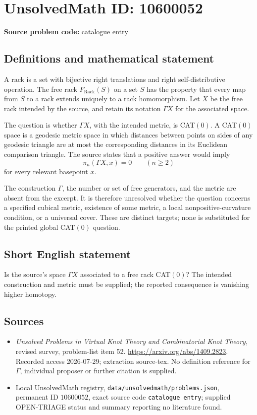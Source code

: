 \documentclass[11pt]{article}
\begin{document}
\section*{UnsolvedMath ID: 10600052}
\textbf{Source problem code:} catalogue entry
\subsection{Definitions and mathematical statement}
A rack is a set with bijective right translations and right self-distributive operation. The free rack \(F_{\mathrm{Rack}}(S)\) on a set \(S\) has the property that every map from \(S\) to a rack extends uniquely to a rack homomorphism. Let \(X\) be the free rack intended by the source, and retain its notation \(\Gamma X\) for the associated space.

The question is whether \(\Gamma X\), with the intended metric, is CAT\((0)\). A CAT\((0)\) space is a geodesic metric space in which distances between points on sides of any geodesic triangle are at most the corresponding distances in its Euclidean comparison triangle. The source states that a positive answer would imply
\[
 \pi_n(\Gamma X,x)=0\qquad(n\geq2)
\]
for every relevant basepoint \(x\).

The construction \(\Gamma\), the number or set of free generators, and the metric are absent from the excerpt. It is therefore unresolved whether the question concerns a specified cubical metric, existence of some metric, a local nonpositive-curvature condition, or a universal cover. These are distinct targets; none is substituted for the printed global CAT\((0)\) question.
\subsection{Short English statement}
Is the source's space \(\Gamma X\) associated to a free rack CAT\((0)\)? The intended construction and metric must be supplied; the reported consequence is vanishing higher homotopy.
\subsection{Sources}
\begin{itemize}
\item \emph{Unsolved Problems in Virtual Knot Theory and Combinatorial Knot Theory}, revised survey, problem-list item 52. \url{https://arxiv.org/abs/1409.2823}. Recorded access 2026-07-29; extraction source-tex. No definition reference for \(\Gamma\), individual proposer or further citation is supplied.
\item Local UnsolvedMath registry, \texttt{data/unsolvedmath/problems.json}, permanent ID \(10600052\), exact source code \texttt{catalogue entry}; supplied OPEN-TRIAGE status and summary reporting no literature found.
\end{itemize}
\end{document}
